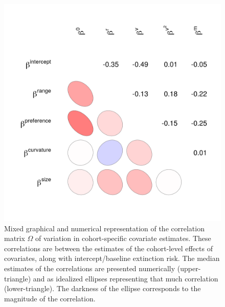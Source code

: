 \documentclass[11pt]{article}
\begin{document}
\begin{figure}[ht]
  \centering
  \includegraphics[height = 0.7\textheight,width=\textwidth,keepaspectratio=true]{figure/wei_cor_heatmap_cweib_cens}
  \caption{Mixed graphical and numerical representation of the correlation matrix \(\Omega\) of variation in cohort-specific covariate estimates. These correlations are between the estimates of the cohort-level effects of covariates, along with intercept/baseline extinction risk. The median estimates of the correlations are presented numerically (upper-triangle) and as idealized ellipses representing that much correlation (lower-triangle). The darkness of the ellipse corresponds to the magnitude of the correlation.}
  \label{fig:cor_posterior}
\end{figure}
\end{document}

